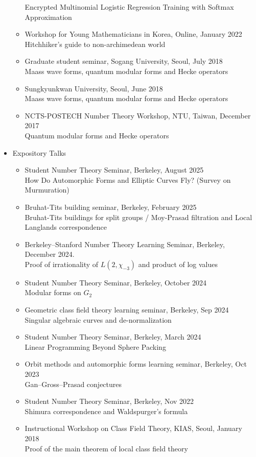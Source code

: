 \documentclass[letterpaper,11pt]{article}
\begin{document}
\begin{itemize}
\begin{itemize}
		Encrypted Multinomial Logistic Regression Training with Softmax Approximation
		\item Workshop for Young Mathematicians in Korea, Online, January 2022 \\
		Hitchhiker's guide to non-archimedean world
		\item Graduate student seminar, Sogang University, Seoul, July 2018 \\
		Maass wave forms, quantum modular forms and Hecke operators
		\item Sungkyunkwan University, Seoul, June 2018 \\
		Maass wave forms, quantum modular forms and Hecke operators
		\item NCTS-POSTECH Number Theory Workshop, NTU, Taiwan, December 2017 \\ 
		Quantum modular forms and Hecke operators
	\end{itemize}
	\item Expository Talks
	\begin{itemize}
		\item Student Number Theory Seminar, Berkeley, August 2025 \\
		How Do Automorphic Forms and Elliptic Curves Fly? (Survey on Murmuration)
		\item Bruhat-Tits building seminar, Berkeley, February 2025 \\
		Bruhat-Tits buildings for split groups / Moy-Prasad filtration and Local Langlands correspondence
		\item Berkeley--Stanford Number Theory Learning Seminar, Berkeley, December 2024.\\
		Proof of irrationality of $L(2, \chi_{-3})$ and product of log values
		\item Student Number Theory Seminar, Berkeley, October 2024 \\
		Modular forms on $G_2$
		\item Geometric class field theory learning seminar, Berkeley, Sep 2024 \\
		Singular algebraic curves and de-normalization
		\item Student Number Theory Seminar, Berkeley, March 2024 \\
		Linear Programming Beyond Sphere Packing
		\item Orbit methods and automorphic forms learning seminar, Berkeley, Oct 2023 \\
		Gan--Gross--Prasad conjectures
		\item Student Number Theory Seminar, Berkeley, Nov 2022 \\
		Shimura correspondence and Waldspurger's formula
		\item Instructional Workshop on Class Field Theory, KIAS, Seoul, January 2018 \\
		Proof of the main theorem of local class field theory
	\end{itemize}
\end{itemize}
\end{document}
